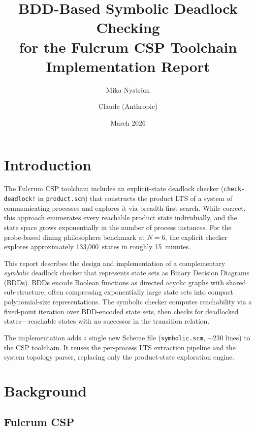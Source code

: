 \documentclass[11pt]{article}
\title{\textbf{BDD-Based Symbolic Deadlock Checking \\
for the Fulcrum CSP Toolchain} \\[0.5em]
\large Implementation Report}
\author{Mika Nystr\"om \and Claude (Anthropic)}
\date{March 2026}
\begin{document}
\maketitle

\tableofcontents
\newpage

\section{Introduction}

The Fulcrum CSP toolchain includes an explicit-state deadlock checker
(\texttt{check-deadlock!} in \texttt{product.scm}) that constructs the
product LTS of a system of communicating processes and explores it via
breadth-first search.  While correct, this approach enumerates every
reachable product state individually, and the state space grows
exponentially in the number of process instances.  For the probe-based
dining philosophers benchmark at $N=6$, the explicit checker explores
approximately 133,000~states in roughly 15~minutes.

This report describes the design and implementation of a complementary
\emph{symbolic} deadlock checker that represents state sets as Binary
Decision Diagrams (BDDs).  BDDs encode Boolean functions as directed
acyclic graphs with shared sub-structure, often compressing
exponentially large state sets into compact polynomial-size
representations.  The symbolic checker computes reachability via a
fixed-point iteration over BDD-encoded state sets, then checks for
deadlocked states---reachable states with no successor in the
transition relation.

The implementation adds a single new Scheme file
(\texttt{symbolic.scm}, $\sim$230 lines) to the CSP toolchain.  It
reuses the per-process LTS extraction pipeline and the system topology
parser, replacing only the product-state exploration engine.

\section{Background}

\subsection{Fulcrum CSP}
\end{document}
